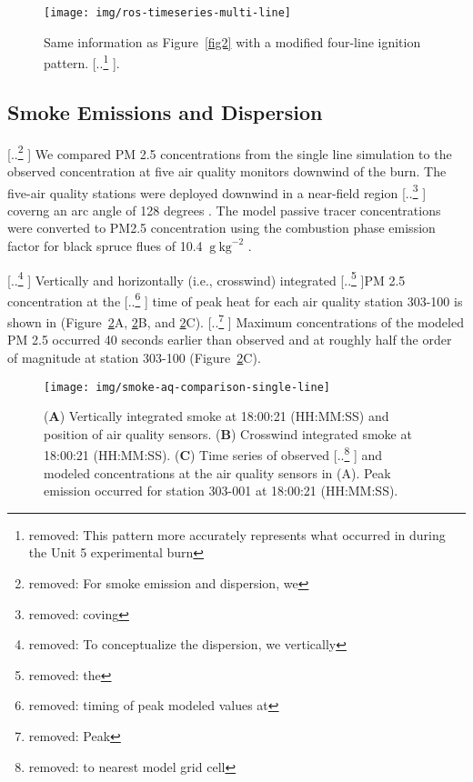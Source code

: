 \documentclass[preprints,article,accept,moreauthors,pdftex]{Definitions/mdpi}
\providecommand{\DIFadd}[1]{{\protect\color{blue} \sf #1}} %
\providecommand{\DIFdel}[1]{{\protect\color{red} [..\footnote{removed: #1} ]}} %
\providecommand{\DIFaddbegin}{} %
\providecommand{\DIFaddend}{} %
\providecommand{\DIFdelbegin}{} %
\providecommand{\DIFdelend}{} %
\providecommand{\DIFaddFL}[1]{\DIFadd{#1}} %
\providecommand{\DIFdelFL}[1]{\DIFdel{#1}} %
\providecommand{\DIFaddbeginFL}{} %
\providecommand{\DIFaddendFL}{} %
\providecommand{\DIFdelbeginFL}{} %
\providecommand{\DIFdelendFL}{} %
\begin{document}
\begin{figure}[H]
\centering
 \texttt{[image: img/ros-timeseries-multi-line]}
 \caption{Same information as Figure~\ref{fig2} with a modified four-line ignition pattern. \DIFdelbeginFL \DIFdelFL{This pattern more accurately represents what occurred in during the Unit 5 experimental burn}\DIFdelendFL .\label{fig3}}
 \end{figure}

\subsection{Smoke Emissions and Dispersion}

\DIFdelbegin \DIFdel{For smoke emission and dispersion, we }\DIFdelend \DIFaddbegin \DIFadd{We }\DIFaddend compared PM 2.5 concentrations from the single line simulation to the observed concentration at five air quality monitors downwind of the burn. The five-air quality stations were deployed downwind in a near-field region \DIFdelbegin \DIFdel{coving }\DIFdelend \DIFaddbegin \DIFadd{coverng }\DIFaddend an arc angle of 128 degrees \cite{huda_study_2020}. The model passive tracer concentrations were converted to PM2.5 concentration using the combustion phase emission factor for black spruce flues of 10.4 $\mathrm{~g}\mathrm{~kg}^{-2}$ \cite{prichard_wildland_2020}.


\DIFdelbegin \DIFdel{To conceptualize the dispersion, we vertically }\DIFdelend \DIFaddbegin \DIFadd{Vertically }\DIFaddend and horizontally (i.e., crosswind) integrated \DIFdelbegin \DIFdel{the }\DIFdelend PM 2.5 concentration at the \DIFdelbegin \DIFdel{timing of peak modeled values at }\DIFdelend \DIFaddbegin \DIFadd{time of peak heat for each }\DIFaddend air quality station 303-100 \DIFaddbegin \DIFadd{is shown in  }\DIFaddend (Figure~\ref{fig4}A, \ref{fig4}B, and \ref{fig4}C). \DIFdelbegin \DIFdel{Peak }\DIFdelend \DIFaddbegin \DIFadd{Maximum }\DIFaddend concentrations of the modeled PM 2.5 occurred 40 seconds earlier than observed and at roughly half the order of magnitude at station 303-100 (Figure~\ref{fig4}C).

\begin{figure}[H]
\centering
 \texttt{[image: img/smoke-aq-comparison-single-line]}
 \caption{(\textbf{A}) Vertically integrated smoke at 18:00:21 (HH:MM:SS) and position of air quality sensors. (\textbf{B}) Crosswind integrated smoke at 18:00:21 (HH:MM:SS). (\textbf{C}) Time series of observed \DIFdelbeginFL \DIFdelFL{to nearest model grid cell}\DIFdelendFL \DIFaddbeginFL \DIFaddFL{and modeled concentrations at the air quality sensors in (A)}\DIFaddendFL . Peak emission occurred for station 303-001 at 18:00:21 (HH:MM:SS).\label{fig4}}
 \end{figure}
\end{document}
